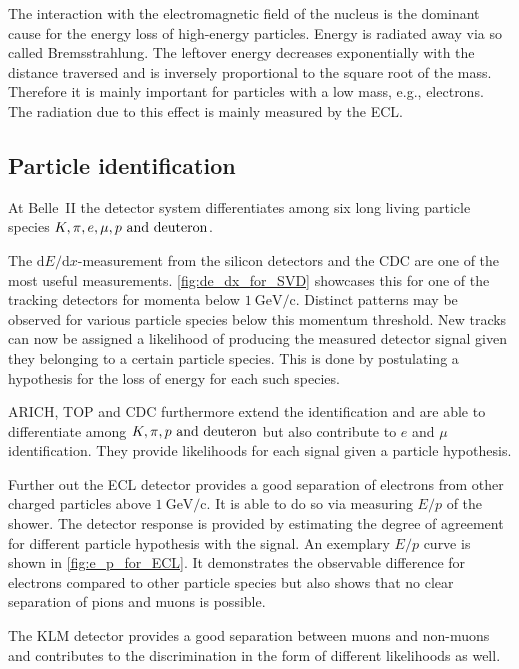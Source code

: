 The interaction with the electromagnetic field of the nucleus is the dominant cause for the energy loss of high-energy particles. Energy is radiated away via so called Bremsstrahlung. The leftover energy decreases exponentially with the distance traversed and is inversely proportional to the square root of the mass. Therefore it is mainly important for particles with a low mass, e.g., electrons. The radiation due to this effect is mainly measured by the ECL.

\subsection{Particle identification}
\label{sec:particle_identification}

At Belle~\RN{2} the detector system differentiates among six long living particle species $K, \pi, e, \mu, p \text{ and } \hbox{deuteron}$.

The $\mathrm{d}E/\mathrm{d}x$-measurement from the silicon detectors and the CDC are one of the most useful measurements. \autoref{fig:de_dx_for_SVD} showcases this for one of the tracking detectors for momenta below $1 \mathrm{~GeV/c}$. Distinct patterns may be observed for various particle species below this momentum threshold.
New tracks can now be assigned a likelihood of producing the measured detector signal given they belonging to a certain particle species. This is done by postulating a hypothesis for the loss of energy for each such species.

ARICH, TOP and CDC furthermore extend the identification and are able to differentiate among $K, \pi, p \text{ and } \hbox{deuteron}$ but also contribute to $e$ and $\mu$ identification. They provide likelihoods for each signal given a particle hypothesis.

Further out the ECL detector provides a good separation of electrons from other charged particles above $1 \mathrm{~GeV/c}$. It is able to do so via measuring $E/p$ of the shower. The detector response is provided by estimating the degree of agreement for different particle hypothesis with the signal. An exemplary $E/p$ curve is shown in \autoref{fig:e_p_for_ECL}. It demonstrates the observable difference for electrons compared to other particle species but also shows that no clear separation of pions and muons is possible.

The KLM detector provides a good separation between muons and non-muons and contributes to the discrimination in the form of different likelihoods as well.

